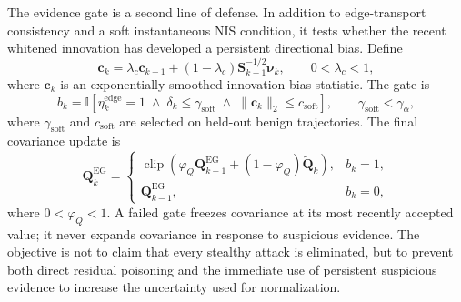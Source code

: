 \documentclass[11pt,a4paper]{article}
\begin{document}
The evidence gate is a second line of defense. In addition to edge-transport consistency and a soft instantaneous NIS condition, it tests whether the recent whitened innovation has developed a persistent directional bias. Define
\begin{equation}
\mathbf{c}_k=\lambda_c\mathbf{c}_{k-1}+(1-\lambda_c)\mathbf{S}_{k-1}^{-1/2}\boldsymbol{\nu}_k,
\qquad 0<\lambda_c<1,
\end{equation}
where $\mathbf{c}_k$ is an exponentially smoothed innovation-bias statistic. The gate is
\begin{equation}
b_k=\mathbb{I}\!\left[\eta_k^{\mathrm{edge}}=1\;\wedge\;\delta_k\leq\gamma_{\mathrm{soft}}\;\wedge\;\|\mathbf{c}_k\|_2\leq c_{\mathrm{soft}}\right],
\qquad \gamma_{\mathrm{soft}}<\gamma_\alpha,
\label{eq:evidence-gate}
\end{equation}
where $\gamma_{\mathrm{soft}}$ and $c_{\mathrm{soft}}$ are selected on held-out benign trajectories. The final covariance update is
\begin{equation}
\mathbf{Q}^{\mathrm{EG}}_k=
\begin{cases}
\operatorname{clip}\!\left(\varphi_Q\mathbf{Q}^{\mathrm{EG}}_{k-1}+(1-\varphi_Q)\widetilde{\mathbf{Q}}_k\right), & b_k=1,\\[4pt]
\mathbf{Q}^{\mathrm{EG}}_{k-1}, & b_k=0,
\end{cases}
\label{eq:evidence-gated-update}
\end{equation}
where $0<\varphi_Q<1$. A failed gate freezes covariance at its most recently accepted value; it never expands covariance in response to suspicious evidence. The objective is not to claim that every stealthy attack is eliminated, but to prevent both direct residual poisoning and the immediate use of persistent suspicious evidence to increase the uncertainty used for normalization.
\end{document}
